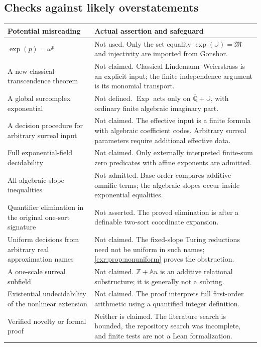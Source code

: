 \documentclass[11pt,letterpaper]{article}
\numberwithin{equation}{section}
\theoremstyle{definition}
\theoremstyle{remark}
\newcommand{\Z}{\mathbb Z}
\newcommand{\A}{\mathbb A}
\newcommand{\Qb}{\overline{\mathbb Q}}
\newcommand{\J}{\mathbb J}
\newcommand{\M}{\mathfrak M}
\newcommand{\Exp}{\operatorname{Exp}}
\begin{document}
\subsection{Checks against likely overstatements}
\begin{longtable}{>{\raggedright\arraybackslash}p{}>{\raggedright\arraybackslash}p{}}
\toprule
Potential misreading & Actual assertion and safeguard\\
\midrule
\endhead
$\exp(p)=\omega^p$ & Not used. Only the set equality $\exp(\J)=\M$ and injectivity
are imported from Gonshor.\\[4pt]
A new classical transcendence theorem & Not claimed. Classical
Lindemann--Weierstrass is an explicit input; the finite independence argument is
its monomial transport.\\[4pt]
A global surcomplex exponential & Not defined. $\Exp$ acts only on $\Qb+\J$,
with ordinary finite algebraic imaginary part.\\[4pt]
A decision procedure for arbitrary surreal input & Not claimed. The effective
input is a finite formula with algebraic coefficient codes. Arbitrary surreal
parameters require additional effective data.\\[4pt]
Full exponential-field decidability & Not claimed. Only externally interpreted
finite-sum zero predicates with affine exponents are admitted.\\[4pt]
All algebraic-slope inequalities & Not admitted. Base order compares additive
omnific terms; the algebraic slopes occur inside exponential equalities.\\[4pt]
Quantifier elimination in the original one-sort signature & Not asserted. The
proved elimination is after a definable two-sort coordinate expansion.\\[4pt]
Uniform decisions from arbitrary real approximation names & Not claimed.
The fixed-slope Turing reductions need not be uniform in such names;
\cref{exr:prop:nonuniform} proves the obstruction.\\[4pt]
A one-scale surreal subfield & Not claimed. $\Z+\A u$ is an additive relational
substructure; it is generally not a subring.\\[4pt]
Existential undecidability of the nonlinear extension & Not claimed. The proof
interprets full first-order arithmetic using a quantified integer definition.\\[4pt]
Verified novelty or formal proof & Neither is claimed. The literature search is
bounded, the repository search was incomplete, and finite tests are not a Lean
formalization.\\
\bottomrule
\end{longtable}
\end{document}

